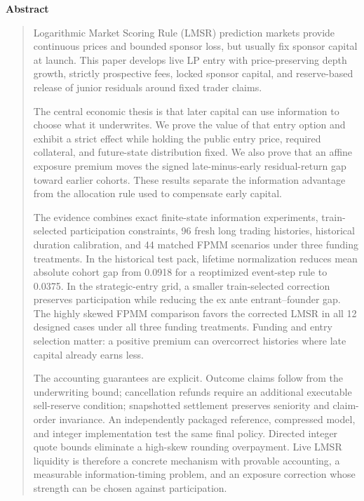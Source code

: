 \documentclass[10pt]{article}
\renewenvironment{abstract}{%
  \centerline{\bfseries\normalsize Abstract}%
  \vspace{0.5ex}%
  \begin{quote}\small
}{%
  \end{quote}%
}
\begin{document}
\begin{abstract}
Logarithmic Market Scoring Rule (LMSR) prediction markets provide continuous prices and bounded sponsor loss, but usually fix sponsor capital at launch. This paper develops live LP entry with price-preserving depth growth, strictly prospective fees, locked sponsor capital, and reserve-based release of junior residuals around fixed trader claims.

The central economic thesis is that later capital can use information to choose what it underwrites. We prove the value of that entry option and exhibit a strict effect while holding the public entry price, required collateral, and future-state distribution fixed. We also prove that an affine exposure premium moves the signed late-minus-early residual-return gap toward earlier cohorts. These results separate the information advantage from the allocation rule used to compensate early capital.

The evidence combines exact finite-state information experiments, train-selected participation constraints, 96 fresh long trading histories, historical duration calibration, and 44 matched FPMM scenarios under three funding treatments. In the historical test pack, lifetime normalization reduces mean absolute cohort gap from 0.0918 for a reoptimized event-step rule to 0.0375. In the strategic-entry grid, a smaller train-selected correction preserves participation while reducing the ex ante entrant--founder gap. The highly skewed FPMM comparison favors the corrected LMSR in all 12 designed cases under all three funding treatments. Funding and entry selection matter: a positive premium can overcorrect histories where late capital already earns less.

The accounting guarantees are explicit. Outcome claims follow from the underwriting bound; cancellation refunds require an additional executable sell-reserve condition; snapshotted settlement preserves seniority and claim-order invariance. An independently packaged reference, compressed model, and integer implementation test the same final policy. Directed integer quote bounds eliminate a high-skew rounding overpayment. Live LMSR liquidity is therefore a concrete mechanism with provable accounting, a measurable information-timing problem, and an exposure correction whose strength can be chosen against participation.
\end{abstract}

\vspace{1em}
{
\small
\renewcommand{\contentsname}{}
\setcounter{tocdepth}{2}
\tableofcontents
}
\vspace{0.5em}
\end{document}
